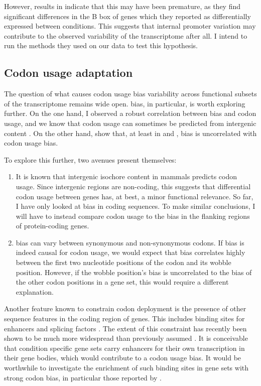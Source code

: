 However, results in \citet{Gingold:2014} indicate that this may have been
premature, as they find significant differences in the B box of \trna genes
which they reported as differentially expressed between conditions. This
suggests that internal promoter variation may contribute to the observed
variability of the \trna transcriptome after all. I intend to run the methods
they used on our data to test this hypothesis.

\subsection{Codon usage adaptation}

The question of what causes codon usage bias variability across functional
subsets of the transcriptome remains wide open. \gc bias, in particular, is
worth exploring further. On the one hand, I observed a robust correlation
between \gc bias and codon usage, and we know that codon usage can sometimes be
predicted from intergenic \gc content \citep{Chen:2004}. On the other hand,
\citet{Duret:2002} show that, at least in  and , \gc
bias is uncorrelated with codon usage bias.

To explore this further, two avenues present themselves:

\begin{enumerate}
    \item It is known that intergenic isochore \gc content in mammals predicts
        codon usage. Since intergenic regions are non-coding, this suggests that
        differential codon usage between genes has, at best, a minor functional
        relevance. So far, I have only looked at \gc bias in coding sequences.
        To make similar conclusions, I will have to instead compare codon usage
        to the \gc bias in the flanking regions of protein-coding genes.
    \item \gc bias can vary between synonymous and non-synonymous codons. If \gc
        bias is indeed causal for codon usage, we would expect that \gc bias
        correlates highly between the first two nucleotide positions of the
        codon and its wobble position. However, if the wobble position’s \gc
        bias is uncorrelated to the \gc bias of the other codon positions in a
        gene set, this would require a different explanation.
\end{enumerate}

Another feature known to constrain codon deployment is the presence of other
sequence features in the coding region of genes. This includes binding sites for
enhancers and splicing factors \citep{Hyder:1995,Blencowe:2000}. The extent of
this constraint has recently been shown to be much more widespread than
previously assumed \citep{Stergachis:2013}. It is conceivable that condition
specific gene sets carry enhancers for their own transcription in their gene
bodies, which would contribute to a codon usage bias. It would be worthwhile to
investigate the enrichment of such binding sites in gene sets with strong codon
bias, in particular those reported by \citep{Gingold:2014}.


